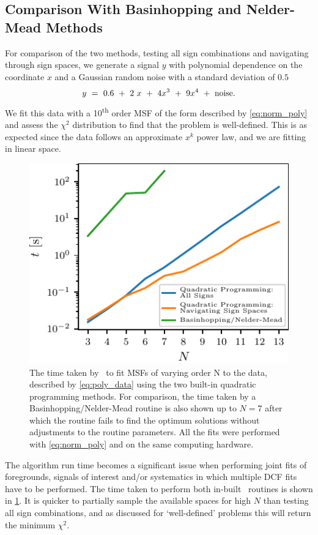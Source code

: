 \subsection{Comparison With Basinhopping and Nelder-Mead Methods}
\label{sec:basinhopping}

For comparison of the two methods, testing all sign combinations and navigating through sign spaces, we generate a signal $y$ with polynomial dependence on the coordinate $x$ and a Gaussian random noise with a standard deviation of $0.5$
\begin{equation}
    y~=~0.6~+~2~x~+~4x^3~+~9x^4~+~\textnormal{noise}.
    \label{eq:poly_data}
\end{equation}
We fit this data with a 10\textsuperscript{th} order MSF of the form described by \cref{eq:norm_poly} and assess the $\chi^2$ distribution to find that the problem is well-defined. This is as expected since the data follows an approximate $x^k$ power law, and we are fitting in linear space.

\begin{figure}
    \centering
    \includegraphics{maxsmooth/figs/Figure7.pdf}
    \caption{ The time taken by \maxsmooth~to fit MSFs of varying order N to the data, described by \cref{eq:poly_data} using the two built-in quadratic programming methods. For comparison, the time taken by a Basinhopping/Nelder-Mead routine is also shown up to $N = 7$ after which the routine fails to find the optimum solutions without adjustments to the routine parameters. All the fits were performed with \cref{eq:norm_poly} and on the same computing hardware.}
    \label{fig:times}
\end{figure}

The algorithm run time becomes a significant issue when performing joint fits of foregrounds, signals of interest and/or systematics in which multiple DCF fits have to be performed. The time taken to perform both in-built \maxsmooth~routines is shown in \cref{fig:times}. It is quicker to partially sample the available spaces for high $N$ than testing all sign combinations, and as discussed for `well-defined' problems this will return the minimum $\chi^2$. 

